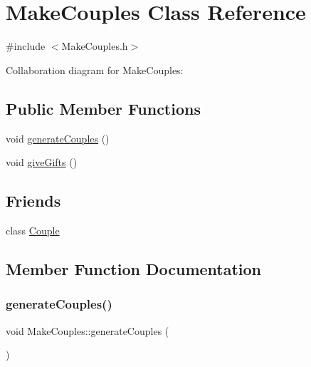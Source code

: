 \hypertarget{class_make_couples}{}\section{Make\+Couples Class Reference}
\label{class_make_couples}


{\ttfamily \#include $<$Make\+Couples.\+h$>$}



Collaboration diagram for Make\+Couples\+:
\subsection*{Public Member Functions}
\begin{DoxyCompactItemize}
\item 
void \hyperlink{class_make_couples_ada939d38013b761a0745620ce2e57195}{generate\+Couples} ()
\item 
void \hyperlink{class_make_couples_a55984a015f74fa6752dba1d9e014ba58}{give\+Gifts} ()
\end{DoxyCompactItemize}
\subsection*{Friends}
\begin{DoxyCompactItemize}
\item 
class \hyperlink{class_make_couples_a94ec3d69c6a9671cf7d5967498c81a90}{Couple}
\end{DoxyCompactItemize}


\subsection{Member Function Documentation}
\mbox{\label{class_make_couples_ada939d38013b761a0745620ce2e57195}} 
\subsubsection{\texorpdfstring{generate\+Couples()}{generateCouples()}}
{\footnotesize\ttfamily void Make\+Couples\+::generate\+Couples (\begin{DoxyParamCaption}{ }\end{DoxyParamCaption})}

\mbox{\label{class_make_couples_a55984a015f74fa6752dba1d9e014ba58}} 
